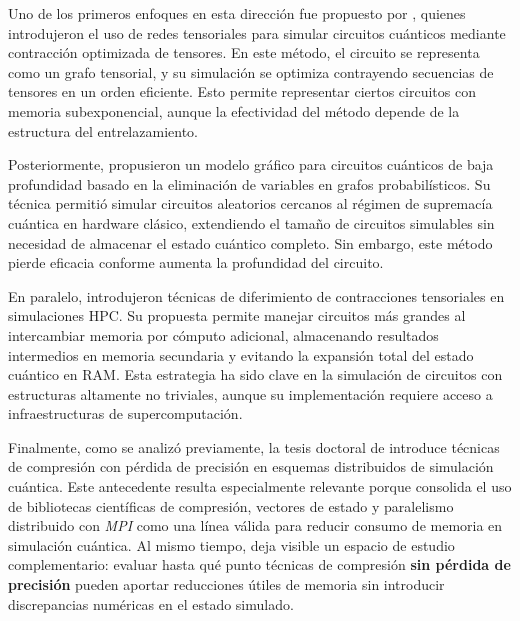 Uno de los primeros enfoques en esta dirección fue propuesto por \textcite{Markov2008},
quienes introdujeron el uso de redes tensoriales para simular circuitos
cuánticos mediante contracción optimizada de tensores. En este método, el
circuito se representa como un grafo tensorial, y su simulación se optimiza contrayendo
secuencias de tensores en un orden eficiente. Esto permite representar ciertos
circuitos con memoria subexponencial, aunque la efectividad del método depende
de la estructura del entrelazamiento.

Posteriormente, \textcite{Boixo2017} propusieron un modelo gráfico para
circuitos cuánticos de baja profundidad basado en la eliminación de variables
en grafos probabilísticos. Su técnica permitió simular circuitos aleatorios cercanos
al régimen de supremacía cuántica en hardware clásico, extendiendo el tamaño
de circuitos simulables sin necesidad de almacenar el estado cuántico completo.
Sin embargo, este método pierde eficacia conforme aumenta la profundidad del
circuito.

En paralelo, \textcite{Pednault2017} introdujeron técnicas de diferimiento de contracciones
tensoriales en simulaciones HPC. Su propuesta permite manejar circuitos más
grandes al intercambiar memoria por cómputo adicional, almacenando resultados intermedios
en memoria secundaria y evitando la expansión total del estado cuántico en RAM.
Esta estrategia ha sido clave en la simulación de circuitos con estructuras
altamente no triviales, aunque su implementación requiere acceso a infraestructuras
de supercomputación.

Finalmente, como se analizó previamente, la tesis doctoral de \textcite{DiazToro2025}
introduce técnicas de compresión con pérdida de precisión en esquemas distribuidos
de simulación cuántica. Este antecedente resulta especialmente relevante porque
consolida el uso de bibliotecas científicas de compresión, vectores de estado y
paralelismo distribuido con \emph{MPI} como una línea válida para reducir consumo
de memoria en simulación cuántica. Al mismo tiempo, deja visible un espacio de
estudio complementario: evaluar hasta qué punto técnicas de compresión
\textbf{sin pérdida de precisión} pueden aportar reducciones útiles de memoria sin
introducir discrepancias numéricas en el estado simulado.
